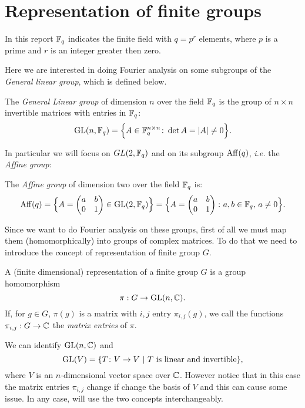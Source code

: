 \section{Representation of finite groups}
In this report ${\mathbb F}_q$ indicates the finite field with $q=p^r$ elements, where $p$ is a prime and $r$ is an integer greater then zero.

Here we are interested in doing Fourier analysis on some subgroups of the \emph{General linear group}, which is defined below. 
\begin{defn}
The {\it General Linear group} of dimension $n$ over the field ${\mathbb F}_q$ is the group of $n\times n$ invertible matrices with entries in ${\mathbb F}_q$:
\begin{equation*}
\operatorname{GL}(n,{\mathbb F}_q)=\Big\{ A \in {\mathbb F}_q^{n \times n} \colon \det A = \lvert A\rvert\neq 0 \Big\}.
\end{equation*}	
\end{defn}
In particular we will focus on $GL(2,{\mathbb F}_q)$ and on its subgroup $\operatorname{Aff}(q)$, \emph{i.e.} the \emph{Affine group}:
\begin{defn}
The {\it Affine group} of dimension two over the field ${\mathbb F}_q$ is:
\begin{equation*}
\operatorname{Aff} (q)=\Big\{ A=\begin{pmatrix} a & b \\ 0 & 1 \end{pmatrix}\in \operatorname{GL}(2,{\mathbb F}_q) \Big\}=\Big\{ A=\begin{pmatrix} a & b \\ 0 & 1 \end{pmatrix} \colon a,b \in {\mathbb F}_q, \, a \neq 0 \Big \}.
\end{equation*}
\end{defn}
Since we want to do Fourier analysis on these groups, first of all we must map them (homomorphically) into groups of complex matrices. To do that we need to introduce the concept of representation of finite group $G$.

\begin{defn}
A (finite dimensional) representation of a finite group $G$ is a group homomorphism
\[
\pi:  G \rightarrow \operatorname{GL}(n,{\mathbb C}).
\]
If, for $g\in G$, $\pi(g)$ is a matrix with $i,j$ entry $\pi_{i,j}(g)$, we call the functions $\pi_{i,j} : G \rightarrow {\mathbb C}$ the \emph{matrix entries} of $\pi$.
\end{defn}
\begin{rem}
We can identify $\operatorname{GL}(n,{\mathbb C})$ and
\[
\operatorname{GL}(V)=\{T\colon V\rightarrow V \ | \  T \text{ is linear and invertible}\},
\]
where $V$ is an $n$-dimensional vector space over ${\mathbb C}$. However notice that in this case the matrix entries $\pi_{i,j}$ change if change the basis of $V$ and this can cause some issue. In any case, will use the two concepts interchangeably.
\end{rem}

